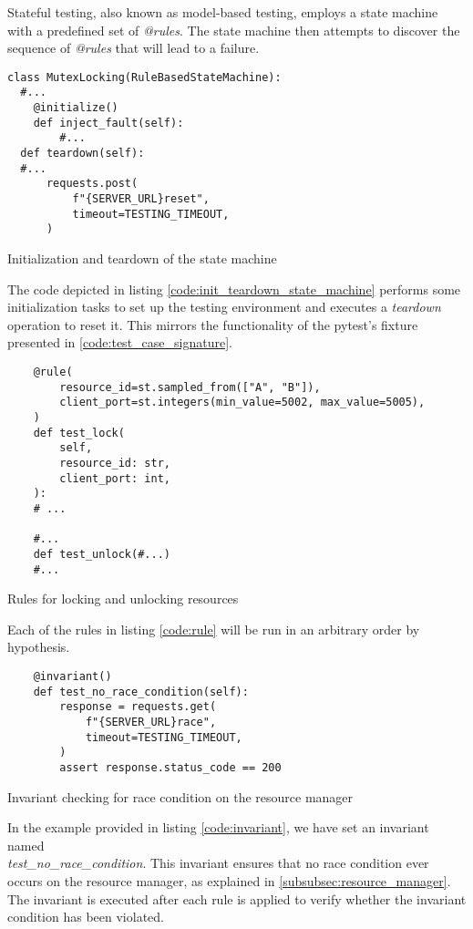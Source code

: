 Stateful testing, also known as model-based testing, employs a state machine with a predefined set of \textit{@rules}. The state machine then attempts to discover the sequence of \textit{@rules} that will lead to a failure.

\begin{listing}[!ht]
  \begin{verbatim}
class MutexLocking(RuleBasedStateMachine):
  #... 
    @initialize()
    def inject_fault(self):
        #...
  def teardown(self):
  #...
      requests.post(
          f"{SERVER_URL}reset",
          timeout=TESTING_TIMEOUT,
      )
 \end{verbatim}
 \caption{Initialization and teardown of the state machine}
 \label{code:init_teardown_state_machine}
\end{listing}

The code depicted in listing \ref{code:init_teardown_state_machine} performs some initialization tasks to set up the testing environment and executes a \textit{teardown} operation to reset it. This mirrors the functionality of the pytest's fixture presented in \ref{code:test_case_signature}.

\begin{listing}[!ht]
  \begin{verbatim}
    @rule(
        resource_id=st.sampled_from(["A", "B"]),
        client_port=st.integers(min_value=5002, max_value=5005),
    )
    def test_lock(
        self,
        resource_id: str,
        client_port: int,
    ):
    # ...

    #... 
    def test_unlock(#...)
    #... 
  \end{verbatim}
  \caption{Rules for locking and unlocking resources}
  \label{code:rule}
\end{listing}

Each of the rules in listing \ref{code:rule} will be run in an arbitrary order by hypothesis.

\begin{listing}[!ht]
  \begin{verbatim}
    @invariant()
    def test_no_race_condition(self):
        response = requests.get(
            f"{SERVER_URL}race",
            timeout=TESTING_TIMEOUT,
        )
        assert response.status_code == 200
  \end{verbatim}
  \caption{Invariant checking for race condition on the resource manager}
  \label{code:invariant}
\end{listing}

In the example provided in listing \ref{code:invariant}, we have set an
invariant named\\ \textit{test\_no\_race\_condition}. This invariant ensures that
no race condition ever occurs on the resource manager, as explained in
\ref{subsubsec:resource_manager}. The invariant is executed after each rule is
applied to verify whether the invariant condition has been violated.

